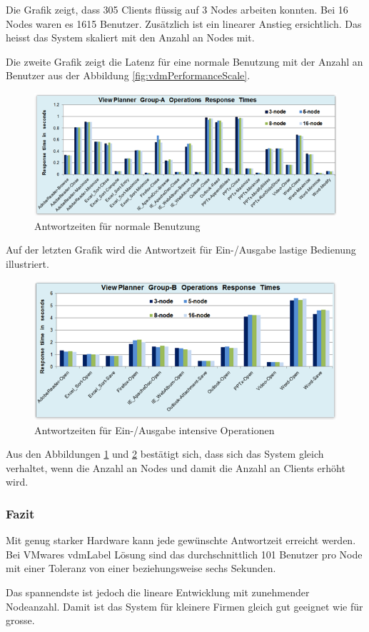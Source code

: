 Die Grafik zeigt, dass 305 Clients flüssig auf 3 Nodes arbeiten konnten. Bei 16 Nodes waren es 1615 Benutzer. Zusätzlich ist ein linearer Anstieg ersichtlich. Das heisst das System skaliert mit den Anzahl an Nodes mit.

Die zweite Grafik zeigt die Latenz für eine normale Benutzung mit der Anzahl an Benutzer aus der Abbildung \ref{fig:vdmPerformanceScale}.
\begin{figure}[H]
	\includegraphics[width=\textwidth]{images/vmware-vdm-performance-normal}
	\caption{Antwortzeiten für normale Benutzung}
	\label{fig:vdmPerformanceNormal}
\end{figure}

Auf der letzten Grafik wird die Antwortzeit für Ein-/Ausgabe lastige Bedienung illustriert.
\begin{figure}[H]
	\includegraphics[width=\textwidth]{images/vmware-vdm-performance-io}
	\caption{Antwortzeiten für Ein-/Ausgabe intensive Operationen}
	\label{fig:vdmPerformanceIo}
\end{figure}

Aus den Abbildungen \ref{fig:vdmPerformanceNormal} und \ref{fig:vdmPerformanceIo} bestätigt sich, dass sich das System gleich verhaltet, wenn die Anzahl an Nodes und damit die Anzahl an Clients erhöht wird.

\subsubsection{Fazit}
Mit genug starker Hardware kann jede gewünschte Antwortzeit erreicht werden. Bei VMwares \Gls{vdmLabel} Lösung sind das durchschnittlich 101 Benutzer pro Node mit einer Toleranz von einer beziehungsweise sechs Sekunden.

Das spannendste ist jedoch die lineare Entwicklung mit zunehmender Nodeanzahl. Damit ist das System für kleinere Firmen gleich gut geeignet wie für grosse.





